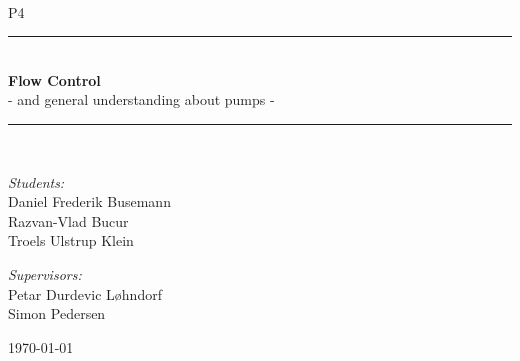 \newcommand{\HRule}{\rule{\linewidth}{0.5 mm}}
\begin{titlepage}

\begin{center}
\\[0.5cm]

\textsc{\Large P4}\\[0.6cm]

\HRule \\[0.8cm]
{ \Huge \bfseries  Flow Control}\\[0.4cm]

  \Large{ - and general understanding about pumps -
  }
\HRule \\[1.2cm]

\begin{minipage}{0.49\textwidth}
\begin{flushleft} \large
\emph{Students:}\\
Daniel Frederik Busemann\\
Razvan-Vlad Bucur\\
Troels Ulstrup Klein\\
\end{flushleft}
\end{minipage}
\begin{minipage}{0.49\textwidth}
\begin{flushright} \large
\emph{Supervisors:} \\
Petar Durdevic Løhndorf\\
Simon Pedersen
\end{flushright}
\end{minipage}

\vfill

{\large \today}



\end{center}

\end{titlepage}
